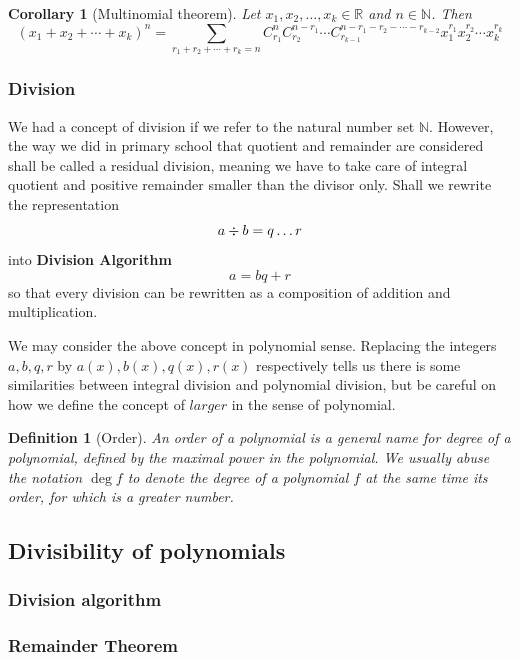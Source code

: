 \documentclass[12pt]{article}
\newtheorem{definition}{Definition}[section]
\newtheorem*{corollary}{Corollary}
\begin{document}
    \begin{corollary}[Multinomial theorem]
        Let $x_1,x_2,\dots,x_k\in\mathbb{R}$ and $n\in\mathbb{N}$. Then \[(x_1+x_2+\cdots+x_k)^n=\sum_{r_1+r_2+\cdots+r_k=n}C_{r_1}^n C_{r_2}^{n-r_1}\cdots C_{r_{k-1}}^{n-r_1-r_2-\cdots-r_{k-2}} x_1^{r_1}x_2^{r_2}\cdots x_k^{r_k} \] 
    \end{corollary}

    \subsubsection*{Division}

    We had a concept of division if we refer to the natural number set $\mathbb{N}$. However, the way we did in primary school that quotient and remainder are considered shall be called a residual division, meaning we have to take care of integral quotient and positive remainder smaller than the divisor only. Shall we rewrite the representation \[a \divisionsymbol b = q \dots r\] into \textbf{Division Algorithm} \[a= bq + r\] so that every division can be rewritten as a composition of addition and multiplication.

    We may consider the above concept in polynomial sense. Replacing the integers $a,b,q,r$ by $a(x),b(x),q(x),r(x)$ respectively tells us there is some similarities between integral division and polynomial division, but be careful on how we define the concept of $larger$ in the sense of polynomial.

    \begin{definition}[Order]
        An order of a polynomial is a general name for degree of a polynomial, defined by the maximal power in the polynomial. We usually abuse the notation $\deg{f}$ to denote the degree of a polynomial $f$ at the same time its order, for which is a greater number. 
    \end{definition}

    \subsection{Divisibility of polynomials}

    \subsubsection*{Division algorithm}

    \subsubsection*{Remainder Theorem}
\end{document}
